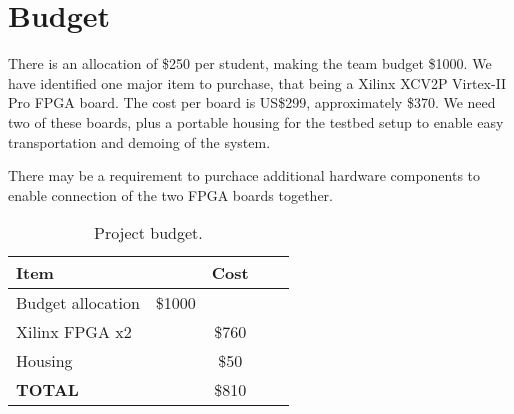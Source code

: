 \section{Budget}

There is an allocation of \$250 per student, making the team budget
\$1000. We have identified one major item to purchase,
that being a Xilinx XCV2P Virtex-II Pro FPGA board. The cost per board is
US\$299, approximately \$370. We need two of these boards, plus a portable housing for the testbed setup to enable easy transportation and demoing of the system.

There may be a requirement to purchace additional hardware components to enable connection of the two FPGA boards together.

\begin{table}[h]
\begin{tabular}{|l|c|c|c|c|}
  \hline
  \textbf{Item} & &\textbf{Cost} \\
  \hline
  \hline
  Budget allocation & \$1000 & \\
  \hline
  Xilinx FPGA x2 & & \$760 \\
  \hline
  Housing & & \$50 \\
  \hline
  \hline
  \textbf{TOTAL} & & \$810 \\
  \hline
\end{tabular}
\caption{Project budget. }
 \label{budget}
\end{table}


